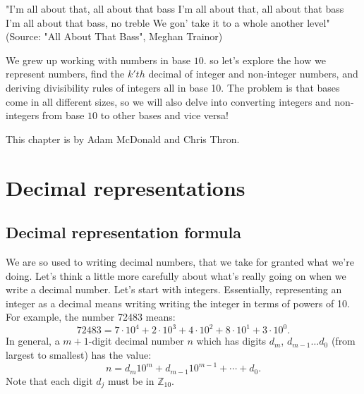 "I'm all about that, all about that bass
I'm all about that, all about that bass
I'm all about that bass, no treble
We gon' take it to a whole another level"
(Source: "All About That Bass", Meghan Trainor)

We grew up working with numbers in base $10$. so let's explore the how we represent numbers, find the $k'th$ decimal of integer and non-integer numbers,  and deriving divisibility rules of integers all in base 10. The problem is that bases come in all different sizes, so we will also delve into converting integers and non-integers from base $10$ to other bases and vice versa!  

This chapter is by Adam McDonald and Chris Thron.

\section{Decimal representations}
\label{sec:decimalReps}


\subsection{Decimal representation formula}
We are so used to writing decimal numbers, that we take for granted what we're doing.  Let's think a little more carefully about what's really going on when we write a decimal number. Let's start with integers. 
Essentially, representing an integer as a decimal   means writing writing the integer in terms of powers of 10.  For example, the number 72483 means:
\begin{equation}
72483=7\cdot 10^{4}+2 \cdot 10^{3}+ 4 \cdot 10^2 + 8 \cdot 10^1 + 3 \cdot 10^0.
\end{equation}
In general, a $m+1$-digit decimal number $n$ which has digits $d_m$, $d_{m-1} \ldots d_0$ (from largest to smallest) has the value:
\begin{equation}
n=d_{m}10^{m}+d_{m-1}10^{m-1}+\cdots+d_{0}. 
\end{equation} 
Note that each digit $d_j$ must be in $\mathbb{Z}_{10}$.

